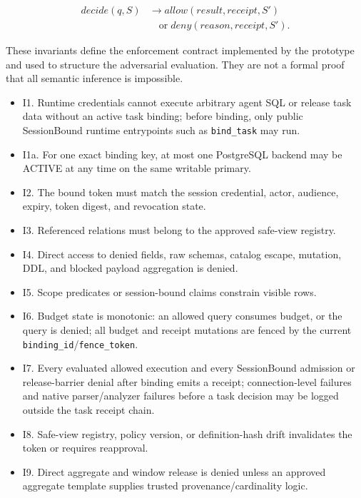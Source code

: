 \documentclass[journal]{IEEEtran}
\providecommand{\tightlist}{%
  \setlength{\itemsep}{0pt}\setlength{\parskip}{0pt}}
\begin{document}
\begin{equation}
\begin{aligned}
decide(q,S) &\rightarrow allow(result,receipt,S')\\
            &\quad \mathrm{or}\; deny(reason,receipt,S').
\end{aligned}
\end{equation}

These invariants define the enforcement contract implemented by the
prototype and used to structure the adversarial evaluation. They are not
a formal proof that all semantic inference is impossible.

\begin{itemize}
\tightlist
\item
  I1. Runtime credentials cannot execute arbitrary agent SQL or release task
  data without an active task binding; before binding, only public
  SessionBound runtime entrypoints such as \texttt{bind\_task} may run.
\item
  I1a. For one exact binding key, at most one PostgreSQL backend may be
  ACTIVE at any time on the same writable primary.
\item
  I2. The bound token must match the session credential, actor,
  audience, expiry, token digest, and revocation state.
\item
  I3. Referenced relations must belong to the approved safe-view
  registry.
\item
  I4. Direct access to denied fields, raw schemas, catalog escape,
  mutation, DDL, and blocked payload aggregation is denied.
\item
  I5. Scope predicates or session-bound claims constrain visible rows.
\item
  I6. Budget state is monotonic: an allowed query consumes budget, or
  the query is denied; all budget and receipt mutations are fenced by
  the current \texttt{binding\_id}/\texttt{fence\_token}.
\item
  I7. Every evaluated allowed execution and every SessionBound admission
  or release-barrier denial after binding emits a receipt; connection-level
  failures and native parser/analyzer failures before a task decision may
  be logged outside the task receipt chain.
\item
  I8. Safe-view registry, policy version, or definition-hash drift
  invalidates the token or requires reapproval.
\item
  I9. Direct aggregate and window release is denied unless an approved
  aggregate template supplies trusted provenance/cardinality logic.
\end{itemize}
\end{document}
